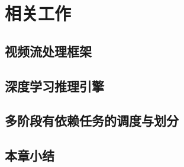 
\chapter{相关工作}\label{related_work}

\section{视频流处理框架}

\section{深度学习推理引擎}

\section{多阶段有依赖任务的调度与划分}

\section{本章小结}